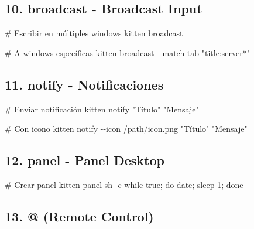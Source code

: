 \documentclass[
  doc,
  floatsintext,
  longtable,
  a4paper,
  nolmodern,
  notxfonts,
  notimes,
  12pt,
  colorlinks=true,linkcolor=blue,citecolor=blue,urlcolor=blue]{apa7}
\newenvironment{Shaded}{\begin{snugshade}}{\end{snugshade}}
\newcommand{\AttributeTok}[1]{\textcolor[rgb]{0.40,0.45,0.13}{#1}}
\newcommand{\CommentTok}[1]{\textcolor[rgb]{0.37,0.37,0.37}{#1}}
\newcommand{\ExtensionTok}[1]{\textcolor[rgb]{0.00,0.23,0.31}{#1}}
\newcommand{\NormalTok}[1]{\textcolor[rgb]{0.00,0.23,0.31}{#1}}
\newcommand{\StringTok}[1]{\textcolor[rgb]{0.13,0.47,0.30}{#1}}
\begin{document}
\subsection{10. broadcast - Broadcast
Input}\label{broadcast---broadcast-input}

\begin{Shaded}
\begin{Highlighting}[]
\CommentTok{\# Escribir en múltiples windows}
\ExtensionTok{kitten}\NormalTok{ broadcast}

\CommentTok{\# A windows específicas}
\ExtensionTok{kitten}\NormalTok{ broadcast }\AttributeTok{{-}{-}match{-}tab} \StringTok{"title:server*"}
\end{Highlighting}
\end{Shaded}

\subsection{11. notify - Notificaciones}\label{notify---notificaciones}

\begin{Shaded}
\begin{Highlighting}[]
\CommentTok{\# Enviar notificación}
\ExtensionTok{kitten}\NormalTok{ notify }\StringTok{"Título"} \StringTok{"Mensaje"}

\CommentTok{\# Con icono}
\ExtensionTok{kitten}\NormalTok{ notify }\AttributeTok{{-}{-}icon}\NormalTok{ /path/icon.png }\StringTok{"Título"} \StringTok{"Mensaje"}
\end{Highlighting}
\end{Shaded}

\subsection{12. panel - Panel Desktop}\label{panel---panel-desktop}

\begin{Shaded}
\begin{Highlighting}[]
\CommentTok{\# Crear panel}
\ExtensionTok{kitten}\NormalTok{ panel sh }\AttributeTok{{-}c} \StringTok{\textquotesingle{}while true; do date; sleep 1; done\textquotesingle{}}
\end{Highlighting}
\end{Shaded}

\subsection{13. @ (Remote Control)}\label{remote-control}
\end{document}
